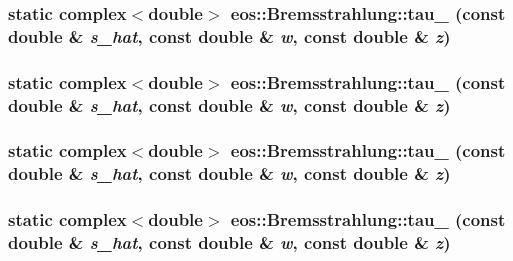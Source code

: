 \label{structeos_1_1Bremsstrahlung_add6d9efe0e4ae23f5751eb78d09c1225}
\hypertarget{structeos_1_1Bremsstrahlung_a544c157bc4ac9251fd2aa8987bb0459d}{
\subsubsection[{tau\_\-22}]{\setlength{\rightskip}{0pt plus 5cm}static complex$<$double$>$ eos::Bremsstrahlung::tau\_ (const double \& {\em s\_\-hat}, \/  const double \& {\em w}, \/  const double \& {\em z})}}
\label{structeos_1_1Bremsstrahlung_a544c157bc4ac9251fd2aa8987bb0459d}
\hypertarget{structeos_1_1Bremsstrahlung_a1e48477fa9e8b56fe4e508590ad21bd3}{
\subsubsection[{tau\_\-27}]{\setlength{\rightskip}{0pt plus 5cm}static complex$<$double$>$ eos::Bremsstrahlung::tau\_ (const double \& {\em s\_\-hat}, \/  const double \& {\em w}, \/  const double \& {\em z})}}
\label{structeos_1_1Bremsstrahlung_a1e48477fa9e8b56fe4e508590ad21bd3}
\hypertarget{structeos_1_1Bremsstrahlung_ae1e1543d756fa96dd3f82645412babb8}{
\subsubsection[{tau\_\-28}]{\setlength{\rightskip}{0pt plus 5cm}static complex$<$double$>$ eos::Bremsstrahlung::tau\_ (const double \& {\em s\_\-hat}, \/  const double \& {\em w}, \/  const double \& {\em z})}}
\label{structeos_1_1Bremsstrahlung_ae1e1543d756fa96dd3f82645412babb8}
\hypertarget{structeos_1_1Bremsstrahlung_a51142a21972c592612539cf4bd35cafb}{
\subsubsection[{tau\_\-29}]{\setlength{\rightskip}{0pt plus 5cm}static complex$<$double$>$ eos::Bremsstrahlung::tau\_ (const double \& {\em s\_\-hat}, \/  const double \& {\em w}, \/  const double \& {\em z})}}
